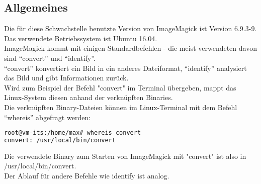 \subsection{Allgemeines}\label{subsec:allgemeines}

Die für diese Schwachstelle benutzte Version von ImageMagick ist Version 6.9.3-9.\\
Das verwendete Betriebssystem ist Ubuntu 16.04.\\

ImageMagick kommt mit einigen Standardbefehlen - die meist verwendeten davon sind "`convert"' und "`identify"'.\\
"`convert"' konvertiert ein Bild in ein anderes Dateiformat, "`identify"' analysiert das Bild und gibt Informationen zurück.\\

Wird zum Beispiel der Befehl "convert" im Terminal übergeben, mappt das Linux-System diesen anhand der verknüpften Binaries.\\

Die verknüpften Binary-Dateien können im Linux-Terminal mit dem Befehl "`whereis"' abgefragt werden:\\

\begin{lstlisting}[language=Bash, caption=whereis Binary Abfrage,label={lst:lstlisting}]
root@vm-its:/home/max# whereis convert
convert: /usr/local/bin/convert
\end{lstlisting}
\vspace{5mm}

Die verwendete Binary zum Starten von ImageMagick mit "convert" ist also in /usr/local/bin/convert.\\
Der Ablauf für andere Befehle wie identify ist analog.\\